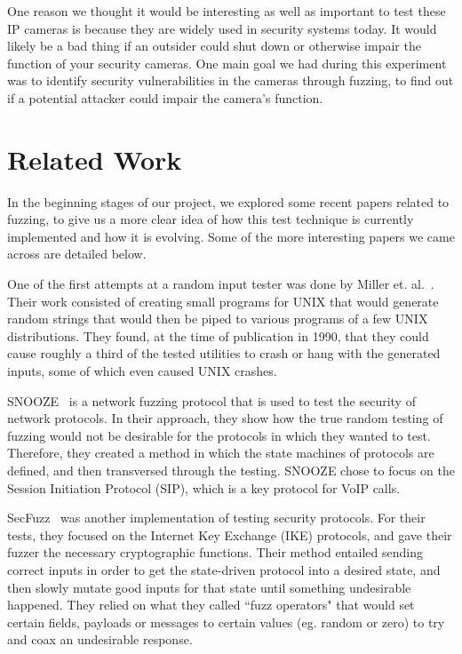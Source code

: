 \documentclass[letterpaper,twocolumn,10pt]{article}
\begin{document}
One reason we thought it would be interesting as well as important to test these IP cameras is because they are widely used in security systems today. It would likely be a bad thing if an outsider could shut down or otherwise impair the function of your security cameras. One main goal we had during this experiment was to identify security vulnerabilities in the cameras through fuzzing, to find out if a potential attacker could impair the camera's function.   



\section{Related Work}
In the beginning stages of our project, we explored some recent papers related to fuzzing, to give us a more clear idea of how this test technique is currently implemented and how it is evolving. Some of the more interesting papers we came across are detailed below. 

One of the first attempts at a random input tester was done by Miller et. al.~\cite{millerUNIX}. Their work consisted of creating small programs for UNIX that would generate random strings that would then be piped to various programs of a few UNIX distributions. They found, at the time of publication in 1990, that they could cause roughly a third of the tested utilities to crash or hang with the generated inputs, some of which even caused UNIX crashes.

SNOOZE~\cite{snooze} is a network fuzzing protocol that is used to test the security of network protocols. In their approach, they show how the true random testing of fuzzing would not be desirable for the protocols in which they wanted to test. Therefore, they created a method in which the state machines of protocols are defined, and then transversed through the testing. SNOOZE chose to focus on the Session Initiation Protocol (SIP), which is a key protocol for VoIP calls.

SecFuzz~\cite{secfuzz} was another implementation of testing security protocols. For their tests, they focused on the Internet Key Exchange (IKE) protocols, and gave their fuzzer the necessary cryptographic functions. Their method entailed sending correct inputs in order to get the state-driven protocol into a desired state, and then slowly mutate good inputs for that state until something undesirable happened. They relied on what they called ``fuzz operators" that would set certain fields, payloads or messages to certain values (eg. random or zero) to try and coax an undesirable response.
\end{document}
